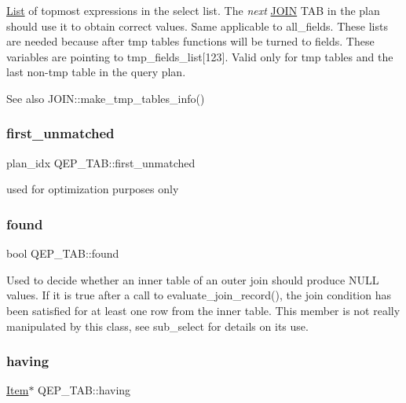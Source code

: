 \mbox{\hyperlink{classList}{List}} of topmost expressions in the select list. The {\itshape next} \mbox{\hyperlink{classJOIN}{J\+O\+IN}} T\+AB in the plan should use it to obtain correct values. Same applicable to all\+\_\+fields. These lists are needed because after tmp tables functions will be turned to fields. These variables are pointing to tmp\+\_\+fields\+\_\+list\mbox{[}123\mbox{]}. Valid only for tmp tables and the last non-\/tmp table in the query plan. \begin{DoxySeeAlso}{See also}
J\+O\+I\+N\+::make\+\_\+tmp\+\_\+tables\+\_\+info() 
\end{DoxySeeAlso}
\mbox{\label{classQEP__TAB_adf94604f65018483cf7aeb8eca0a7f44}} 
\subsubsection{\texorpdfstring{first\+\_\+unmatched}{first\_unmatched}}
{\footnotesize\ttfamily plan\+\_\+idx Q\+E\+P\+\_\+\+T\+A\+B\+::first\+\_\+unmatched}

used for optimization purposes only \mbox{\label{classQEP__TAB_ae3dd18c4599e6e7ce3ec0f3bde45aaed}} 
\subsubsection{\texorpdfstring{found}{found}}
{\footnotesize\ttfamily bool Q\+E\+P\+\_\+\+T\+A\+B\+::found}

Used to decide whether an inner table of an outer join should produce N\+U\+LL values. If it is true after a call to evaluate\+\_\+join\+\_\+record(), the join condition has been satisfied for at least one row from the inner table. This member is not really manipulated by this class, see sub\+\_\+select for details on its use. \mbox{\label{classQEP__TAB_aaca14beabf566906a4dd0b2c36b3c40e}} 
\subsubsection{\texorpdfstring{having}{having}}
{\footnotesize\ttfamily \mbox{\hyperlink{classItem}{Item}}$\ast$ Q\+E\+P\+\_\+\+T\+A\+B\+::having}

